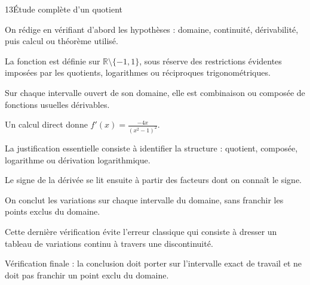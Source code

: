 \documentclass[11pt,a4paper]{article}
\newcommand{\R}{\mathbb{R}}
\begin{document}
\begin{corrbox}{13}{Étude complète d'un quotient}

\begin{methodebox}
On rédige en vérifiant d'abord les hypothèses : domaine, continuité, dérivabilité, puis calcul ou théorème utilisé.
\end{methodebox}

La fonction est définie sur $\R\setminus\{-1,1\}$, sous réserve des restrictions évidentes imposées par les quotients, logarithmes ou réciproques trigonométriques.


Sur chaque intervalle ouvert de son domaine, elle est combinaison ou composée de fonctions usuelles dérivables.


Un calcul direct donne $f'(x)=\frac{-4x}{(x^2-1)^2}$.


La justification essentielle consiste à identifier la structure : quotient, composée, logarithme ou dérivation logarithmique.


Le signe de la dérivée se lit ensuite à partir des facteurs dont on connaît le signe.


On conclut les variations sur chaque intervalle du domaine, sans franchir les points exclus du domaine.


Cette dernière vérification évite l'erreur classique qui consiste à dresser un tableau de variations continu à travers une discontinuité.


\begin{attentionbox}
Vérification finale : la conclusion doit porter sur l'intervalle exact de travail et ne doit pas franchir un point exclu du domaine.
\end{attentionbox}

\end{corrbox}
\end{document}

